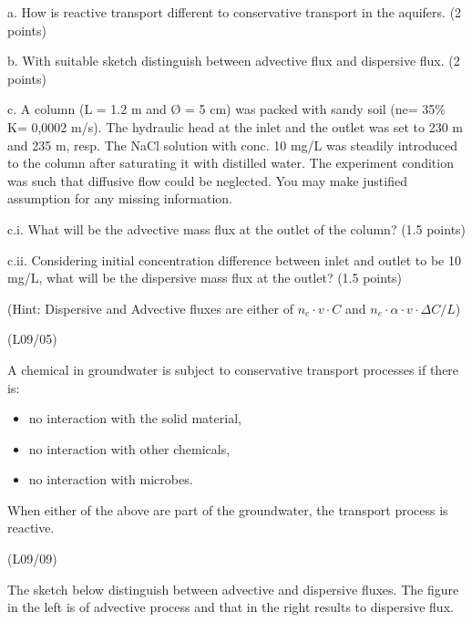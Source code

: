 \documentclass[letterpaper,10pt,english]{jupyterBook}
\begin{document}
\sphinxAtStartPar
a. How is reactive transport different to conservative transport in the aquifers. (2 points)

\sphinxAtStartPar
b. With suitable sketch distinguish between advective flux and dispersive flux. (2 points)

\sphinxAtStartPar
c. A column (L = 1.2 m and Ø = 5 cm) was packed with sandy soil (ne= 35\%  K= 0,0002 m/s). The hydraulic head at the inlet and the outlet was set to 230 m and 235 m, resp. The NaCl solution with conc. 10 mg/L was steadily introduced to the column after saturating it with distilled water. The experiment condition was such that diffusive flow could be neglected.  You may make justified assumption for any missing information.

\sphinxAtStartPar
c.i. What will be the advective mass flux at the outlet of the column? (1.5 points)

\sphinxAtStartPar
c.ii. Considering initial concentration difference between inlet and outlet to be 10 mg/L, what    will be the dispersive mass flux at the outlet? (1.5 points)

\sphinxAtStartPar
(Hint: Dispersive and Advective fluxes are either of \( n_e \cdot v\cdot C\) and \(n_e\cdot \alpha \cdot v \cdot \Delta C/L\))

\sphinxAtStartPar
{} (L09/05)

\sphinxAtStartPar
A chemical in groundwater is subject to conservative transport processes if there is:
\begin{itemize}
\item {} 
\sphinxAtStartPar
no interaction with the solid material,

\item {} 
\sphinxAtStartPar
no interaction with other chemicals,

\item {} 
\sphinxAtStartPar
no interaction with microbes.

\end{itemize}

\sphinxAtStartPar
When either of the above are part of the groundwater, the transport process is reactive.

\sphinxAtStartPar
{} (L09/09)

\sphinxAtStartPar
The sketch below distinguish between advective and dispersive fluxes. The figure in the left is of advective process and that in the right results to dispersive flux.
\end{document}
